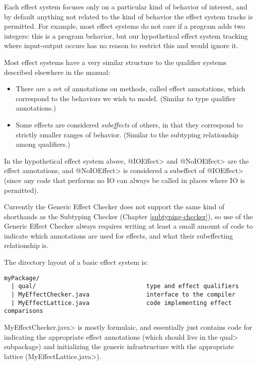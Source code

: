 Each effect system focuses only on a particular kind of behavior of interest, and by default anything not related to the kind of behavior the effect system tracks is permitted.  For example, most effect systems do not care if a program adds two integers: this is a program behavior, but our hypothetical effect system tracking where input-output occurs has no reason to restrict this and would ignore it.

Most effect systems have a very similar structure to the qualifier systems described elsewhere in the manual:
\begin{itemize}
    \item There are a set of annotations on methods, called effect annotations, which correspond to the behaviors we wish to model. (Similar to type qualifier annotations.)
    \item Some effects are considered \emph{subeffects} of others, in that they correspond to strictly smaller ranges of behavior. (Similar to the subtyping relationship among qualifiers.)
\end{itemize}
In the hypothetical effect system above, \<@IOEffect> and \<@NoIOEffect> are the effect annotations, and \<@NoIOEffect> is considered a subeffect of \<@IOEffect> (since any code that performs no IO can always be called in places where IO is permitted).



Currently the Generic Effect Checker does not support the same kind of shorthands as the Subtyping Checker (Chapter \ref{subtyping-checker}), so use of the Generic Effect Checker always requires writing at least a small amount of code to indicate which annotations are used for effects, and what their subeffecting relationship is.

The directory layout of a basic effect system is:
%
\begin{Verbatim}
myPackage/
  | qual/                               type and effect qualifiers
  | MyEffectChecker.java                interface to the compiler
  | MyEffectLattice.java                code implementing effect comparisons
\end{Verbatim}
%
\<MyEffectChecker.java> is mostly formulaic, and essentially just contains code for indicating the appropriate effect annotations (which should live in the \<qual> subpackage) and initializing the generic infrastructure with the appropriate lattice (\<MyEffectLattice.java>).

